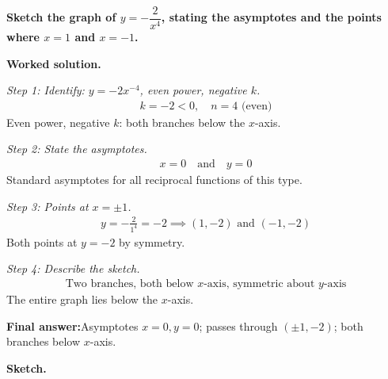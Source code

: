 \documentclass[11pt]{article}
\newcommand{\question}[1]{\par\medskip\noindent\textbf{#1}\par}
\begin{document}
\question{Sketch the graph of \( y = -\dfrac{2}{x^4} \), stating the asymptotes and the points where \( x = 1 \) and \( x = -1 \).}

\textbf{Worked solution.}

\textit{Step 1: Identify: \( y = -2x^{-4} \), even power, negative \( k \).}
\[\begin{gathered}
k = -2 < 0, \quad n = 4 \text{ (even)}
\end{gathered}\]
Even power, negative \( k \): both branches below the \( x \)-axis.

\textit{Step 2: State the asymptotes.}
\[\begin{gathered}
x = 0 \quad \text{and} \quad y = 0
\end{gathered}\]
Standard asymptotes for all reciprocal functions of this type.

\textit{Step 3: Points at \( x = \pm 1 \).}
\[\begin{gathered}
y = -\frac{2}{1^4} = -2 \implies (1, -2) \text{ and } (-1, -2)
\end{gathered}\]
Both points at \( y = -2 \) by symmetry.

\textit{Step 4: Describe the sketch.}
\[\begin{gathered}
\text{Two branches, both below }x\text{-axis, symmetric about }y\text{-axis}
\end{gathered}\]
The entire graph lies below the \( x \)-axis.

\begin{answerbox}
\textbf{Final answer:}\quad Asymptotes \(\displaystyle x = 0, y = 0\); passes through \(\displaystyle (\pm 1, -2)\); both branches below \(\displaystyle x\)-axis.
\end{answerbox}
\textbf{Sketch.}
\end{document}
